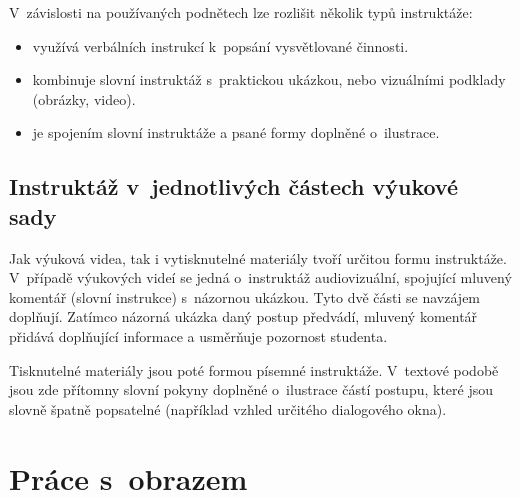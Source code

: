 \noindent V~závislosti na používaných podnětech lze rozlišit několik typů instruktáže:
\begin{itemize}[topsep=0pt]
    \setlength\itemsep{0em}
    \item {} využívá verbálních instrukcí k~popsání vysvětlované činnosti.
    \item {} kombinuje slovní instruktáž s~praktickou ukázkou, nebo vizuálními podklady (obrázky, video).
    \item {} je spojením slovní instruktáže a psané formy doplněné o~ilustrace.
\end{itemize}

\subsection{Instruktáž v~jednotlivých částech výukové sady}
Jak výuková videa, tak i vytisknutelné materiály tvoří určitou formu instruktáže.
V~případě výukových videí se jedná o~instruktáž audiovizuální, spojující mluvený komentář (slovní instrukce) s~názornou ukázkou.
Tyto dvě části se navzájem doplňují.
Zatímco názorná ukázka daný postup předvádí, mluvený komentář přidává doplňující informace a usměrňuje pozornost studenta.

Tisknutelné materiály jsou poté formou písemné instruktáže.
V~textové podobě jsou zde přítomny slovní pokyny doplněné o~ilustrace částí postupu, které jsou slovně špatně popsatelné (například vzhled určitého dialogového okna).

\section{Práce s~obrazem}

\newpage